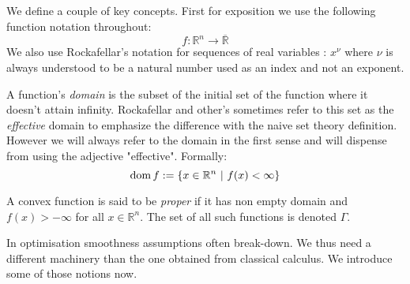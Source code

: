 We define a couple of key concepts. 
First for exposition we use the following function notation throughout:
\begin{equation*}
	f: \mathbb R^n \longrightarrow \overline{\mathbb R} 
\end{equation*}
We also use Rockafellar's notation \autocite{rockafellar2009variational} for 
sequences of real variables : $x^{\nu}$ where $\nu$ is always understood 
to be a natural number used as an index and not an exponent.
\begin{definition}
A function's \emph{domain} is the subset of the initial set 
of the function where it doesn't attain infinity. Rockafellar
and other's sometimes refer to this set as the \emph{effective} domain
to emphasize the difference with the naive set theory definition. However
we will always refer to the domain in the first sense and will dispense from
using the adjective "effective". Formally:
\begin{equation*}
	\mathrm{dom} \, f := \{x\in\mathbb R^n \ |\ f(x)< \infty\}
\end{equation*}
\end{definition}
%
\begin{definition}
	A convex function is said to be \emph{proper} if it has non empty domain
	and $f(x)>-\infty$ for all $x\in\mathbb R^n$. The set of all such
	functions is denoted $\Gamma$.
\end{definition}

\noindent In optimisation smoothness assumptions often break-down. We thus need
a different machinery than the one obtained from classical calculus. We
introduce some of those notions now. 

